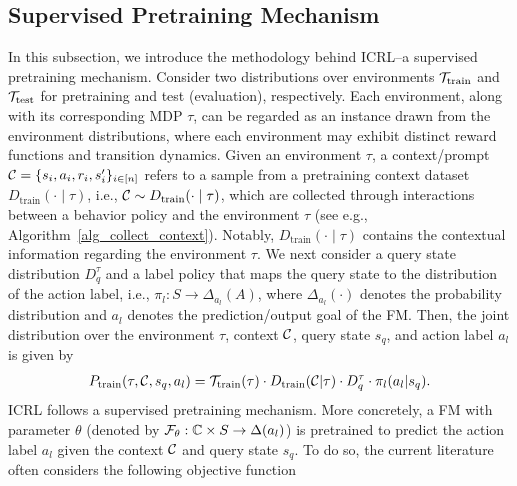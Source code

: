 
\subsection{Supervised Pretraining Mechanism}

In this subsection, we introduce the methodology behind ICRL--a supervised pretraining mechanism. Consider two distributions over environments ${\mathcal T}_{\text{train}}$ and ${\mathcal T}_{\text{test}}$ {for} pretraining and test (evaluation), respectively. Each environment, along with its corresponding MDP $\tau$, can be regarded as an instance drawn from the environment distributions, where each environment may exhibit distinct reward functions and transition dynamics.
%
Given an environment $\tau$, a context/prompt ${\mathcal C} = \{s_i, a_i, r_i, s_i'\}_{i \in [n]}$ refers to a sample from a pretraining context dataset $D_{\text{train}} (\cdot \mid \tau)$, i.e., ${\mathcal C} \sim D_{\text{train}} (\cdot \mid \tau)$, which are collected through interactions between a behavior policy and the environment $\tau$ (see e.g., Algorithm~\ref{alg_collect_context}). Notably, $D_{\text{train}} (\cdot \mid \tau)$ contains the contextual information regarding the environment $\tau$.
%
We next consider a query state distribution $D_q^\tau$ and a label policy that maps the query state to the distribution of the action label, i.e., $\pi_{l}: S \to \Delta_{a_l} (A)$, where $\Delta_{a_l}(\cdot)$ denotes the probability distribution and $a_l$ denotes the prediction/output goal of the FM.
Then, the joint distribution over the environment $\tau$, context ${\mathcal C}$, query state $s_{q}$, and action label $a_{l}$ is given by
\begin{align}\label{eqn_pretrain_distribution}
    P_{\text{train}} (\tau, {\mathcal C}, s_{q}, a_{l}) = {\mathcal T}_{\text{train}} (\tau) \cdot D_{\text{train}} ({\mathcal C} | \tau) \cdot D_q^\tau \cdot \pi_{l}(a_{l} | s_{q}).
\end{align}
%
%
%
ICRL follows a supervised pretraining mechanism. More concretely, a FM with parameter $\theta$ (denoted by ${\mathcal F}_\theta: {\mathbb C} \times S \to \Delta (a_{l})$) is pretrained to predict the action label $a_{l}$ given the context ${\mathcal C}$ and query state $s_{q}$. To do so, the current literature~\citep{laskin2022context, lee2024supervised, dong2024context} often considers the following objective function
